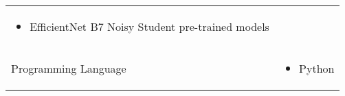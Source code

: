 \begin{table}[htpb]
\begin{tabularx}{\textwidth}{l X}
\begin{itemize}
			                               \item EfficientNet B7 Noisy Student pre-trained models
		                               \end{itemize}                                            \\
		\addlinespace
		Programming Language         & \begin{itemize}
			                               \item Python
		                               \end{itemize}                                                                                   \\
		\bottomrule
	\end{tabularx}
\end{table}

